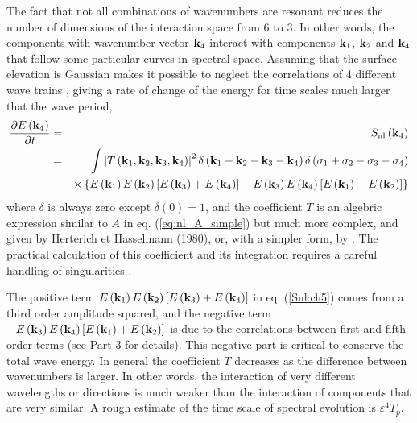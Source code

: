 The fact that not all combinations of wavenumbers are resonant reduces 
the number of dimensions of the interaction space from 6 to 3.  In other words, the components with wavenumber vector $\mathbf{k}_4$ interact with components 
$\mathbf{k}_1$, $\mathbf{k}_2$ and $\mathbf{k}_4$ that follow some particular curves in spectral space. Assuming that the surface elevation is Gaussian makes it possible to neglect 
the correlations of 4 different wave trains \citep{Hasselmann1962},  giving a rate of change of the energy for time scales much larger that the wave period, 
\begin{eqnarray}
\frac{\partial E \left(\mathbf{k}_4\right)}{\partial t}
    & = & S_{\mathrm{nl}} \left( \mathbf{k}_4 \right) \nonumber\\
    & = & \int
    \left|T \left(\mathbf{k}_1,\mathbf{k}_2,\mathbf{k}_3,\mathbf{k}_4 \right)
    \right|^2
 \delta\left(\mathbf{k}_1+\mathbf{k}_2-\mathbf{k}_3-\mathbf{k}_4\right)
    \delta\left(\sigma_1+\sigma_2-\sigma_3-\sigma_4\right) \label{Snl:ch5}\\
 &&   \times \left\{E\left(\mathbf{k}_1\right)E\left(\mathbf{k}_2\right)
    \left[E\left(\mathbf{k}_3\right)+E\left(\mathbf{k}_4\right)\right]
    -E\left(\mathbf{k}_3\right)E\left(\mathbf{k}_4\right)
    \left[E\left(\mathbf{k}_1\right)+E\left(\mathbf{k}_2\right)\right]\right\}
    \nonumber
\end{eqnarray}
where $\delta$ is always zero except $\delta(0)=1$, and the coefficient $T$ is an algebric expression similar to $A$ in eq. (\ref{eq:nl_A_simple}) but much more complex, and given by Herterich
et Hasselmann (1980\nocite{Herterich&Hasselmann1980}), or, with a simpler form, by  \cite{Zakharov1999}. 
The practical calculation of this coefficient and its integration requires a careful handling of singularities \citep[e.g.][]{Gorman2003}. 

The positive term $E\left(\mathbf{k}_1\right)E\left(\mathbf{k}_2\right)
    \left[E\left(\mathbf{k}_3\right)+E\left(\mathbf{k}_4\right)\right]$ in eq. (\ref{Snl:ch5}) comes from a third order amplitude squared, 
and the negative term $-E\left(\mathbf{k}_3\right)E\left(\mathbf{k}_4\right)
    \left[E\left(\mathbf{k}_1\right)+E\left(\mathbf{k}_2\right)\right]$ is due to the correlations between 
first and fifth order terms (see Part 3 for details). 
This negative part is critical to conserve the total wave energy. In general the coefficient $T$ decreases as the difference between wavenumbers 
is larger. In other words, the interaction of very different wavelengths or directions is much weaker than the interaction of
components that are very similar. A rough estimate of the time scale of spectral evolution is $\varepsilon^4
T_p$. 


